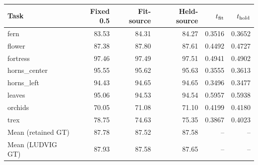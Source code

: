 \begin{tabular}{lrrrrr}
\toprule
Task & Fixed 0.5 & Fit-source & Held-source & $t_{\rm fit}$ & $t_{\rm hold}$ \\
\midrule
fern & 83.53 & 84.31 & 84.27 & 0.3516 & 0.3652 \\
flower & 87.38 & 87.80 & 87.61 & 0.4492 & 0.4727 \\
fortress & 97.46 & 97.49 & 97.51 & 0.4941 & 0.4902 \\
horns\_center & 95.55 & 95.62 & 95.63 & 0.3555 & 0.3613 \\
horns\_left & 94.43 & 94.65 & 94.65 & 0.3496 & 0.3477 \\
leaves & 95.06 & 94.53 & 94.54 & 0.5957 & 0.5938 \\
orchids & 70.05 & 71.08 & 71.10 & 0.4199 & 0.4180 \\
trex & 78.75 & 74.63 & 75.35 & 0.3867 & 0.4023 \\
\midrule Mean (retained GT) & 87.78 & 87.52 & 87.58 & -- & -- \\
\midrule Mean (LUDVIG GT) & 87.93 & 87.58 & 87.65 & -- & -- \\
\bottomrule
\end{tabular}
